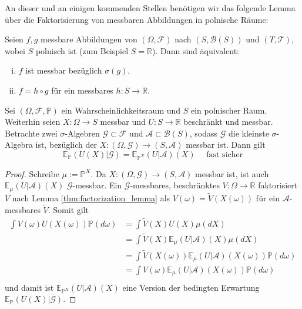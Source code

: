 An dieser und an einigen kommenden Stellen benötigen wir das folgende Lemma über die Faktorisierung von messbaren Abbildungen in polnische Räume:
\begin{lemma}\label{thm:factorization_lemma}
Seien $f,g$ messbare Abbildungen von $(\Omega, \mathcal{F})$ nach $(S, \mathcal{B}(S))$ und $(T, \mathcal{T})$, wobei $S$ polnisch ist (zum Beispiel $S=\mathbb{R}$). Dann sind äquivalent:
\begin{enumerate}[(i)]
    \item $f$ ist messbar bezüglich $\sigma(g)$.
    \item $f=h\circ g$ für ein messbares $h: S \rightarrow \mathbb{R}$.
\end{enumerate}
\end{lemma}
\begin{lemma}\label{thm:pushforward_expectancy}
Sei $(\Omega, \mathcal{F}, \mathbb{P})$ ein Wahrscheinlichkeitsraum und $S$ ein polnischer Raum. Weiterhin seien $X: \Omega \rightarrow S$ messbar und $U: S\rightarrow \mathbb{R}$ beschränkt und messbar. Betrachte zwei $\sigma$-Algebren $\mathcal{G}\subset \mathcal{F}$ und $\mathcal{A} \subset \mathcal{B}(S)$, sodass $\mathcal{G}$ die kleinste $\sigma$-Algebra ist, bezüglich der $X: (\Omega, \mathcal{G}) \rightarrow (S, \mathcal{A})$ messbar ist. Dann gilt
$$\mathbb{E}_{\mathbb{P}}(U(X) \vert \mathcal{G}) = \mathbb{E}_{\mathbb{P}^X}(U \vert \mathcal{A})(X) \quad \text{ fast sicher}$$
\end{lemma}
\begin{proof}
Schreibe $\mu := \mathbb{P}^X$. Da $X: (\Omega, \mathcal{G}) \rightarrow (S, \mathcal{A})$ messbar ist, ist auch $\mathbb{E}_\mu(U\vert \mathcal{A})(X)$ $\mathcal{G}$-messbar. Ein $\mathcal{G}$-messbares, beschränktes $V:\Omega \rightarrow \mathbb{R}$ faktorisiert $V$ nach Lemma \ref{thm:factorization_lemma} als $V(\omega) = \tilde{V}(X(\omega))$ für ein $\mathcal{A}$-messbares $\tilde{V}$. Somit gilt
\begin{align*}
\int V(\omega)U(X(\omega))\mathbb{P}(d\omega) &= \int \tilde{V}(X)U(X) \mu(dX)  \\
&= \int \tilde{V}(X)\mathbb{E}_\mu(U \vert \mathcal{A})(X) \mu(dX) \\
&= \int \tilde{V}(X(\omega)) \mathbb{E}_\mu(U \vert \mathcal{A})(X(\omega)) \mathbb{P}(d\omega) \\
&= \int V(\omega) \mathbb{E}_\mu(U \vert \mathcal{A})(X(\omega)) \mathbb{P}(d\omega) \\
\end{align*}
und damit ist $\mathbb{E}_{\mathbb{P}^{X}}(U \vert \mathcal{A})(X)$ eine Version der bedingten Erwartung $\mathbb{E}_{\mathbb{P}}(U(X) \vert \mathcal{G})$.
\end{proof}

